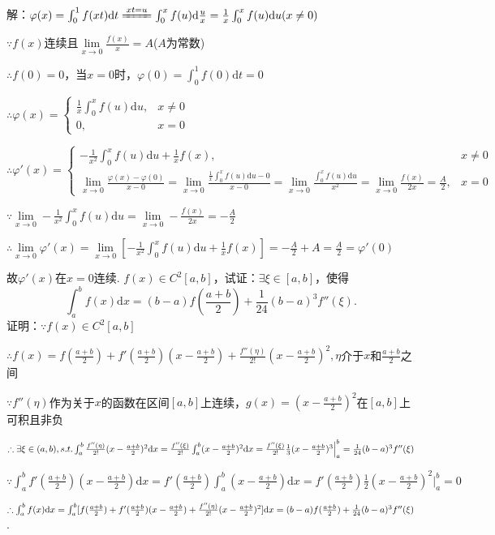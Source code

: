 \documentclass[12pt,UTF8]{ctexart}
\begin{document}
\begin{enumerate}
解：$\varphi(x)=\int_0^1f(xt)\mathrm dt\xlongequal{xt=u}\int_0^xf(u)\mathrm d\frac ux=\frac1x\int_0^xf(u)\mathrm du(x\neq0)$

$\because f(x)$连续且$\lim\limits_{x\rightarrow0}\frac{f(x)}x=A$($A$为常数)

$\therefore f(0)=0$，当$x=0$时，$\varphi(0)=\int_0^1f(0)\mathrm dt=0$

$\therefore\varphi(x)=\begin{cases}
\frac1x\int_0^xf(u)\mathrm du,&x\neq0\\
0,&x=0
\end{cases}$

$\therefore\varphi'(x)=\begin{cases}
-\frac1{x^2}\int_0^xf(u)\mathrm du+\frac1xf(x),&x\neq0\\
\lim\limits_{x\rightarrow0}\frac{\varphi(x)-\varphi(0)}{x-0}=\lim\limits_{x\rightarrow0}\frac{\frac1x\int_0^xf(u)\mathrm du-0}{x-0}=\lim\limits_{x\rightarrow0}\frac{\int_0^xf(u)\mathrm du}{x^2}=\lim\limits_{x\rightarrow0}\frac{f(x)}{2x}=\frac A2,&x=0
\end{cases}$

$\because\lim\limits_{x\rightarrow0}-\frac1{x^2}\int_0^xf(u)\mathrm du=\lim\limits_{x\rightarrow0}-\frac{f(x)}{2x}=-\frac A2$

$\therefore\lim\limits_{x\rightarrow0}\varphi'(x)=\lim\limits_{x\rightarrow0}[-\frac1{x^2}\int_0^xf(u)\mathrm du+\frac1xf(x)]=-\frac A2+A=\frac A2=\varphi'(0)$

故$\varphi'(x)$在$x=0$连续.
$f(x)\in C^2[a,b]$，试证：$\exists\xi\in[a,b]$，使得
\[
\int_a^bf(x)\mathrm dx=(b-a)f(\frac{a+b}2)+\frac1{24}(b-a)^3f''(\xi).
\]
证明：$\because f(x)\in C^2[a,b]$

$\therefore f(x)=f(\frac{a+b}2)+f'(\frac{a+b}2)(x-\frac{a+b}2)+\frac{f''(\eta)}{2!}(x-\frac{a+b}2)^2,\eta$介于$x$和$\frac{a+b}2$之间

$\because f''(\eta)$作为关于$x$的函数在区间$[a,b]$上连续，$g(x)=(x-\frac{a+b}2)^2$在$[a,b]$上可积且非负

$\therefore\exists\xi\in(a,b),s.t.\int_a^b\frac{f''(\eta)}{2!}(x-\frac{a+b}2)^2\mathrm dx=\frac{f''(\xi)}{2!}\int_a^b(x-\frac{a+b}2)^2\mathrm dx=\frac{f''(\xi)}{2!}\frac13(x-\frac{a+b}2)^3\Big|_a^b\\
=\frac1{24}(b-a)^3f''(\xi)$

$\because\int_a^bf'(\frac{a+b}2)(x-\frac{a+b}2)\mathrm dx=f'(\frac{a+b}2)\int_a^b(x-\frac{a+b}2)\mathrm dx=f'(\frac{a+b}2)\frac12(x-\frac{a+b}2)^2\Big|_a^b=0$

$\therefore\int_a^bf(x)\mathrm dx=\int_a^b[f(\frac{a+b}2)+f'(\frac{a+b}2)(x-\frac{a+b}2)+\frac{f''(\eta)}{2!}(x-\frac{a+b}2)^2]\mathrm dx\\
=(b-a)f(\frac{a+b}2)+\frac1{24}(b-a)^3f''(\xi)$.
\end{enumerate}
\end{document}

